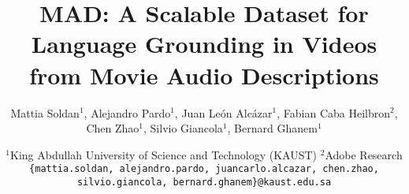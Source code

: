 \documentclass[10pt,twocolumn,letterpaper]{article}
\begin{document}
\title{MAD: A Scalable Dataset for Language Grounding in Videos\\from Movie Audio Descriptions }

{\author{
Mattia Soldan$^{1}$, 
\quad Alejandro Pardo$^{1}$,
\quad Juan León Alcázar$^{1}$,
\quad Fabian Caba Heilbron$^{2}$, \\
\quad Chen Zhao$^{1}$,
\quad Silvio Giancola$^{1}$, 
\quad Bernard Ghanem$^{1}$
\and
$^{1}$King Abdullah University of Science and Technology (KAUST) \quad $^{2}$Adobe Research\\
{\tt\small \{mattia.soldan, alejandro.pardo, juancarlo.alcazar, chen.zhao,}\\ 
{\tt\small silvio.giancola, bernard.ghanem\}@kaust.edu.sa}
}}

\maketitle
\end{document}
